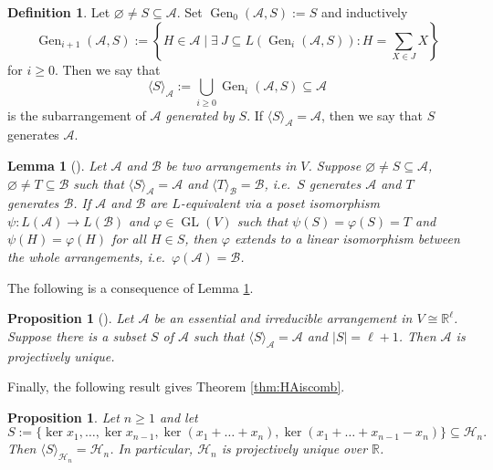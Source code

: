 \documentclass[12pt]{amsart}
\newcommand\CA{{\mathscr A}}
\newcommand\CB{{\mathscr B}}
\newcommand\CH{{\mathscr H}}
\newcommand\BBR{{\mathbb R}}
\newcommand\GL{\operatorname{GL}}
\newcommand\Gen{\operatorname{Gen}}
\numberwithin{equation}{section}
\theoremstyle{plain}
\newtheorem{lemma}[equation]{Lemma}
\newtheorem{prop}[equation]{Proposition}
\theoremstyle{definition}
\newtheorem{defn}[equation]{Definition}
\begin{document}
\begin{defn}
	\label{def:gen}
	Let $\varnothing \ne S \subseteq \CA$. Set $\Gen_0(\CA,S) := S$ and inductively $$\Gen_{i+1}(\CA,S) := \left\{H \in \CA \mid \exists\  J \subseteq L(\Gen_i(\CA,S)) : H = \sum_{X \in J} X \right\}$$ for $i \ge 0$.
	Then we say that
	$$\langle S \rangle_\CA := \bigcup_{i\ge 0} \Gen_i(\CA,S) \subseteq \CA$$
	is the subarrangement of $\CA$
	\emph{generated by $S$}. If $\langle S \rangle_\CA  = \CA$, then we say that $S$ generates $\CA$. 
\end{defn}

\begin{lemma}[{\cite[Lem.~3.5]{GMMR}}]
	\label{lem:gen}
	Let $\CA$ and $\CB$ be two arrangements in $V$.
	Suppose $\varnothing \ne S \subseteq \CA$, $\varnothing \ne T \subseteq \CB$
	such that $\langle S \rangle_\CA = \CA$ and $\langle T \rangle_\CB = \CB$, i.e.~$S$ generates $\CA$
	and $T$ generates $\CB$.
	If $\CA$ and $\CB$ are $L$-equivalent via a poset isomorphism $\psi:L(\CA)\to L(\CB)$ and $\varphi \in \GL(V)$
	such that 
	$\psi(S) = \varphi(S) = T$ and $\psi(H) = \varphi(H)$ for all $H \in S$, 
	then $\varphi$ extends to a linear isomorphism between the whole arrangements, i.e.\
	$\varphi(\CA) = \CB$.
\end{lemma}

The following is a consequence of Lemma \ref{lem:gen}.

\begin{prop}[{\cite[Prop.~3.6]{GMMR}}]
	\label{prop:gen}
	Let $\CA$ be an essential and irreducible arrangement in $V \cong \BBR^\ell$.
	Suppose there is a subset $S$ of $\CA$ such that $\langle S \rangle_\CA = \CA$ and $|S| = \ell+1$.
	Then $\CA$ is projectively unique.
\end{prop}

Finally, the following result gives
Theorem \ref{thm:HAiscomb}.

\begin{prop}
	\label{prop:genCSG}
	Let $ n \ge 1$ and  
	let 
	$$S := \{\ker x_1, \ldots, \ker x_{n-1}, \ker(x_1 + \ldots + x_n), \ker(x_1 + \ldots + x_{n-1} - x_n)\} \subseteq \CH_n.$$ Then
	$\langle S \rangle_{\CH_n} = \CH_n$.
	In particular, $\CH_n$ is projectively unique over $\BBR$.
\end{prop}
\end{document}
